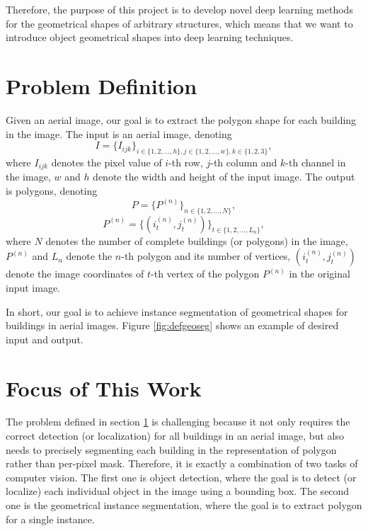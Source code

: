 Therefore, the purpose of this project is to develop novel deep learning methods for the geometrical shapes of arbitrary structures, which means that we want to introduce object geometrical shapes into deep learning techniques.

\section{Problem Definition}\label{prodef}
Given an aerial image, our goal is to extract the polygon shape for each building in the image. The input is an aerial image, denoting 
\begin{equation}
I = \{I_{ijk}\}_{i \in \{1,2,\ldots,h\}, j \in \{1,2,\ldots,w\}, k \in \{1,2,3\}},
\end{equation}
where $I_{ijk}$ denotes the pixel value of $i$-th row, $j$-th column and $k$-th channel in the image, $w$ and $h$ denote the width and height of the input image. The output is polygons, denoting
\begin{equation}
P = \{P^{(n)}\}_{n \in \{1,2,\ldots,N\}},
\end{equation}
\begin{equation}
P^{(n)} = \{(i^{(n)}_t, j^{(n)}_t)\}_{t \in \{1,2,\ldots,L_n\}},
\end{equation}
where $N$ denotes the number of complete buildings (or polygons) in the image, $P^{(n)}$ and $L_n$ denote the $n$-th polygon and its number of vertices, $(i^{(n)}_t, j^{(n)}_t)$ denote the image coordinates of $t$-th vertex of the polygon $P^{(n)}$ in the original input image.

In short, our goal is to achieve instance segmentation of geometrical shapes for buildings in aerial images. Figure \ref{fig:defgeoseg} shows an example of desired input and output.



\newpage

\section{Focus of This Work}\label{fcswrk}
The problem defined in section \ref{prodef} is challenging because it not only requires the correct detection (or localization) for all buildings in an aerial image, but also needs to precisely segmenting each building in the representation of polygon rather than per-pixel mask. Therefore, it is exactly a combination of two tasks of computer vision. The first one is object detection, where the goal is to detect (or localize) each individual object in the image using a bounding box. The second one is the geometrical instance segmentation, where the goal is to extract polygon for a single instance.

